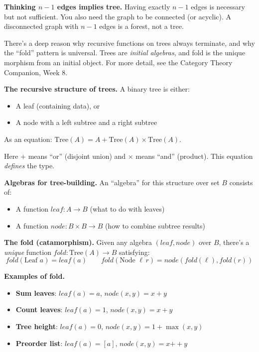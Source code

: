 \begin{commonmistake}
\textbf{Thinking $n-1$ edges implies tree.} Having exactly $n-1$ edges is necessary but not sufficient. You also need the graph to be connected (or acyclic). A disconnected graph with $n-1$ edges is a forest, not a tree.
\end{commonmistake}

\begin{goingdeeper}
There's a deep reason why recursive functions on trees always terminate, and why the ``fold'' pattern is universal. Trees are \emph{initial algebras}, and fold is the unique morphism from an initial object.
For more detail, see the Category Theory Companion, Week 8.

\textbf{The recursive structure of trees.} A binary tree is either:
\begin{itemize}
  \item A leaf (containing data), or
  \item A node with a left subtree and a right subtree
\end{itemize}
As an equation: $\text{Tree}(A) = A + \text{Tree}(A) \times \text{Tree}(A)$.

Here $+$ means ``or'' (disjoint union) and $\times$ means ``and'' (product). This equation \emph{defines} the type.

\textbf{Algebras for tree-building.} An ``algebra'' for this structure over set $B$ consists of:
\begin{itemize}
  \item A function $\textit{leaf}: A \to B$ (what to do with leaves)
  \item A function $\textit{node}: B \times B \to B$ (how to combine subtree results)
\end{itemize}

\textbf{The fold (catamorphism).} Given any algebra $(\textit{leaf}, \textit{node})$ over $B$, there's a \emph{unique} function $\textit{fold}: \text{Tree}(A) \to B$ satisfying:
\[
\textit{fold}(\text{Leaf } a) = \textit{leaf}(a) \qquad \textit{fold}(\text{Node } \ell\, r) = \textit{node}(\textit{fold}(\ell), \textit{fold}(r))
\]

\textbf{Examples of fold.}
\begin{itemize}
  \item \textbf{Sum leaves}: $\textit{leaf}(a) = a$, $\textit{node}(x, y) = x + y$
  \item \textbf{Count leaves}: $\textit{leaf}(a) = 1$, $\textit{node}(x, y) = x + y$
  \item \textbf{Tree height}: $\textit{leaf}(a) = 0$, $\textit{node}(x, y) = 1 + \max(x, y)$
  \item \textbf{Preorder list}: $\textit{leaf}(a) = [a]$, $\textit{node}(x, y) = x \mathbin{+\!\!+} y$
\end{itemize}


\end{goingdeeper}
